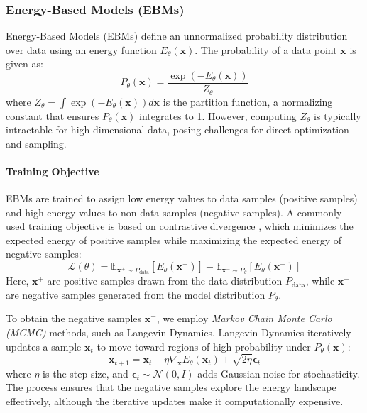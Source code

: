 \subsubsection{Energy-Based Models (EBMs)}\label{sec:energy_based_models}

Energy-Based Models (EBMs) \cite{lecun2006tutorial} define an unnormalized probability distribution over data using an energy function \( E_{\theta}(\mathbf{x}) \). The probability of a data point \( \mathbf{x} \) is given as:
\[
P_{\theta}(\mathbf{x}) = \frac{\exp(-E_{\theta}(\mathbf{x}))}{Z_{\theta}}
\]
where \( Z_{\theta} = \int \exp(-E_{\theta}(\mathbf{x})) d\mathbf{x} \) is the partition function, a normalizing constant that ensures \( P_{\theta}(\mathbf{x}) \) integrates to 1. However, computing \( Z_{\theta} \) is typically intractable for high-dimensional data, posing challenges for direct optimization and sampling.

\paragraph{Training Objective}

EBMs are trained to assign low energy values to data samples (positive samples) and high energy values to non-data samples (negative samples). A commonly used training objective is based on contrastive divergence \cite{hinton2002training}, which minimizes the expected energy of positive samples while maximizing the expected energy of negative samples:
\[
\mathcal{L}(\theta) = \mathbb{E}_{\mathbf{x}^+ \sim P_{\text{data}}} [E_{\theta}(\mathbf{x}^+)] - \mathbb{E}_{\mathbf{x}^- \sim P_{\theta}} [E_{\theta}(\mathbf{x}^-)]
\]
Here, \( \mathbf{x}^+ \) are positive samples drawn from the data distribution \( P_{\text{data}} \), while \( \mathbf{x}^- \) are negative samples generated from the model distribution \( P_{\theta} \).

To obtain the negative samples \( \mathbf{x}^- \), we employ \textit{Markov Chain Monte Carlo (MCMC)} methods, such as Langevin Dynamics. Langevin Dynamics iteratively updates a sample \( \mathbf{x}_t \) to move toward regions of high probability under \( P_{\theta}(\mathbf{x}) \):
\[
\mathbf{x}_{t+1} = \mathbf{x}_t - \eta \nabla_{\mathbf{x}} E_{\theta}(\mathbf{x}_t) + \sqrt{2\eta} \mathbf{\epsilon}_t
\]
where \( \eta \) is the step size, and \( \mathbf{\epsilon}_t \sim \mathcal{N}(0, I) \) adds Gaussian noise for stochasticity. The process ensures that the negative samples explore the energy landscape effectively, although the iterative updates make it computationally expensive.

